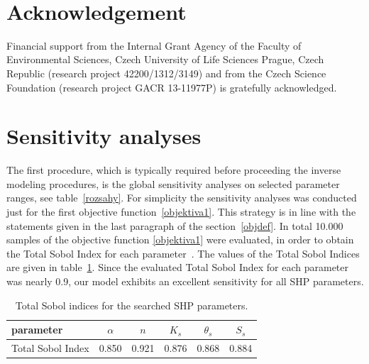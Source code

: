 \documentclass[review,times,3p,twocolumn,10pt]{elsarticle}
\begin{document}
\bigskip
~

\section{Acknowledgement}

Financial support from the Internal Grant Agency of the Faculty of Environmental Sciences, Czech University of Life Sciences Prague, Czech Republic (research project 42200/1312/3149) and from the Czech Science Foundation (research project GACR 13-11977P) is gratefully acknowledged.




 


\appendix
 \section{Sensitivity analyses} 

The first procedure, which is typically required before proceeding the inverse modeling procedures, is the global sensitivity analyses on  selected parameter ranges, see table~\ref{rozsahy}. For simplicity the sensitivity analyses was conducted just for the first objective function~\eqref{objektiva1}. This strategy is in line with the statements given in the last paragraph of the section~\ref{objdef}. In total 10.000 samples of the objective function \eqref{objektiva1}  were evaluated, in order to obtain the  Total Sobol Index for each parameter~\citep{kniha-citlivost}. The values of the Total Sobol Indices are given in table~\ref{citlivost}. Since the evaluated Total Sobol Index for each parameter was nearly 0.9, our model exhibits an excellent sensitivity for all SHP parameters. 

\begin{table}[ht]
\begin{center}
\caption{Total Sobol indices for the searched SHP parameters.}
\begin{small}
\doublespacing
\begin{tabular}{l||c c c c c}
\toprule
parameter & $\alpha$ & $n$ & $K_s$ & $\theta_s$ & $S_s$ \\ \hline
\toprule
Total Sobol Index & 0.850 & 0.921 & 0.876 & 0.868 & 0.884 \\
\toprule
\end{tabular}
\end{small}
\label{citlivost}
\end{center}
\end{table}
\end{document}
